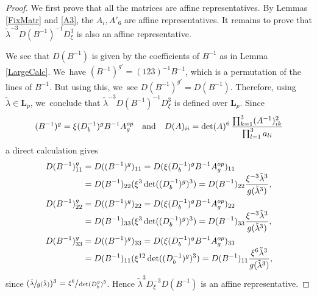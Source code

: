 \documentclass[10pt,a4paper]{amsart}
\newcommand{\op}{\textup{op}}
\newcommand{\quand}{\quad\text{and}\quad}
\theoremstyle{definition}
\newcommand{\LL}{{\boldsymbol{L}}}
\begin{document}
\begin{proof}
We first prove that all the matrices are affine representatives. By Lemmas \ref{FixMatr} and \ref{A3}, the $A_i, A'_6$ are affine representatives. It remains to prove that $ \tilde \lambda^{-3} D(B^{-1})^{-1}D_{\xi}^3$ is also an affine representative.

We see that $D(B^{-1})$ is given by the coefficients of $B^{-1}$ as in Lemma \ref{LargeCalc}. We~have $(B^{-1})^{g'} = (123)^{-1}B^{-1}$, which is a permutation of the lines of $B^{-1}$. But using this, we~see $D(B^{-1})^{g'} = D(B^{-1})$. Therefore, using $\tilde \lambda \in \LL_p$, we~conclude that $ \tilde \lambda^{-3} D(B^{-1})^{-1}D_{\xi}^3$ is defined over $\LL_p$. Since\vspace*{-3pt}
\[
(B^{-1})^g = \xi (D_b^{-1})^g B^{-1}A_g^{\op}
\quand
D(A)_{ii} = \det(A)^6\,\frac{\prod_{k=1}^3(A^{-1})_{ik}^2}{\prod_{l=1}^3a_{li}}
\]
a direct calculation gives
\begin{align*}
D(B^{-1})^g_{11} &= D((B^{-1})^g)_{11} = D(\xi (D_b^{-1})^g B^{-1}A_g^{\op})_{11}
\\[-3pt]
&= D(B^{-1})_{22} (\xi^3 \det((D_b^{-1})^g)^3) = D(B^{-1})_{22} \frac{\xi^{-3} \tilde \lambda^3}{g(\tilde \lambda ^3)},
\\
D(B^{-1})^g_{22} &= D((B^{-1})^g)_{22} = D(\xi (D_b^{-1})^g B^{-1}A_g^{\op})_{22}
\\[-3pt]
&= D(B^{-1})_{33} (\xi^3 \det((D_b^{-1})^g)^3) =D(B^{-1})_{33} \frac{\xi^{-3} \tilde \lambda^3}{g(\tilde \lambda ^3)},
\\
D(B^{-1})^g_{33} &= D((B^{-1})^g)_{33} = D(\xi (D_b^{-1})^g B^{-1}A_g^{\op})_{33}
\\[-3pt]
&= D(B^{-1})_{11} (\xi^{12} \det((D_b^{-1})^g)^3) = D(B^{-1})_{11} \frac{\xi^{6} \tilde \lambda^3}{g(\tilde \lambda ^3)},
\end{align*}
since $(\sfrac{\tilde \lambda}{g(\tilde \lambda)})^3 = \sfrac{\xi^6}{\operatorname{det}(D_b^g)^3}$. Hence $\tilde \lambda^{3} D_{\xi}^{-3} D(B^{-1})$ is an affine representative.


\end{proof}
\end{document}
